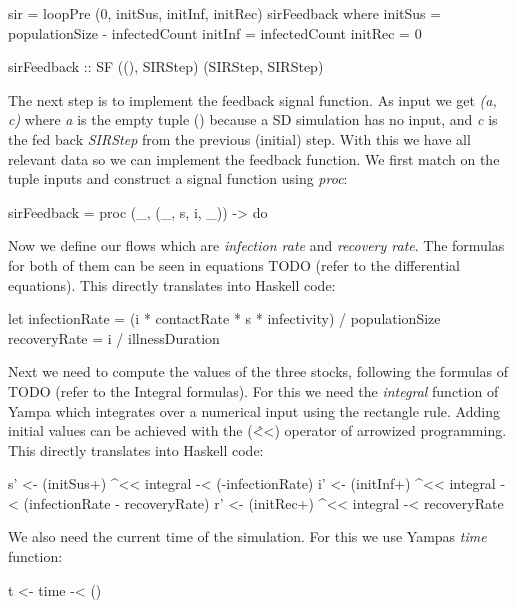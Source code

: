 \begin{HaskellCode}
sir = loopPre (0, initSus, initInf, initRec) sirFeedback
  where
    initSus = populationSize - infectedCount
    initInf = infectedCount
    initRec = 0
  
    sirFeedback :: SF ((), SIRStep) (SIRStep, SIRStep)
\end{HaskellCode}

The next step is to implement the feedback signal function. As input we get \textit{(a, c)} where \textit{a} is the empty tuple () because a SD simulation has no input, and \textit{c} is the fed back \textit{SIRStep} from the previous (initial) step. With this we have all relevant data so we can implement the feedback function. We first match on the tuple inputs and construct a signal function using \textit{proc}:

\begin{HaskellCode}
    sirFeedback = proc (_, (_, s, i, _)) -> do
\end{HaskellCode}

Now we define our flows which are \textit{infection rate} and \textit{recovery rate}. The formulas for both of them can be seen in equations TODO (refer to the differential equations). This directly translates into Haskell code:

\begin{HaskellCode}
      let infectionRate = (i * contactRate * s * infectivity) / populationSize
          recoveryRate  = i / illnessDuration
\end{HaskellCode}

Next we need to compute the values of the three stocks, following the formulas of TODO (refer to the Integral formulas). For this we need the \textit{integral} function of Yampa which integrates over a numerical input using the rectangle rule. Adding initial values can be achieved with the (\^ <<) operator of arrowized programming. This directly translates into Haskell code:

\begin{HaskellCode}
      s' <- (initSus+) ^<< integral -< (-infectionRate)
      i' <- (initInf+) ^<< integral -< (infectionRate - recoveryRate)
      r' <- (initRec+) ^<< integral -< recoveryRate
\end{HaskellCode}

We also need the current time of the simulation. For this we use Yampas \textit{time} function:

\begin{HaskellCode}
      t <- time -< ()
\end{HaskellCode}

